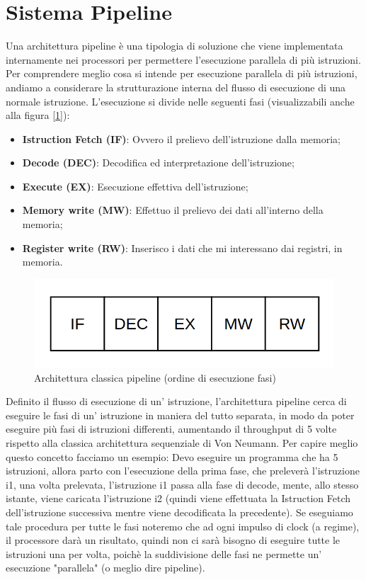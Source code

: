 \newpage
\section{Sistema Pipeline}
Una architettura pipeline è una tipologia di soluzione che viene implementata internamente nei processori per permettere l'esecuzione parallela di più istruzioni.
Per comprendere meglio cosa si intende per esecuzione parallela di più istruzioni, andiamo a considerare la strutturazione interna del flusso di esecuzione di una normale istruzione. L'esecuzione si divide nelle seguenti fasi (visualizzabili anche alla figura [\ref{img:pipe}]):
\begin{itemize}
    \item \textbf{Istruction Fetch (IF)}: Ovvero il prelievo dell'istruzione dalla memoria;
    \item \textbf{Decode (DEC)}: Decodifica ed interpretazione dell'istruzione;
    \item \textbf{Execute (EX)}: Esecuzione effettiva dell'istruzione;
    \item \textbf{Memory write (MW)}: Effettuo il prelievo dei dati all'interno della memoria;
    \item \textbf{Register write (RW)}: Inserisco i dati che mi interessano dai registri, in memoria. 
\end{itemize}

\begin{figure}[ht]
    \centering
    \includegraphics[width=.5\textwidth]{img/Pipeline.png}
    \caption{Architettura classica pipeline (ordine di esecuzione fasi)}\label{img:pipe}
\end{figure}

Definito il flusso di esecuzione di un' istruzione, l'architettura pipeline cerca di eseguire le fasi di un' istruzione in maniera del tutto separata, in modo da poter eseguire più fasi di istruzioni differenti, aumentando il throughput di 5 volte rispetto alla classica architettura sequenziale di Von Neumann. Per capire meglio questo concetto facciamo un esempio:
Devo eseguire un programma che ha 5 istruzioni, allora parto con l'esecuzione della prima fase, che preleverà l'istruzione i1, una volta prelevata, l'istruzione i1 passa alla fase di decode, mente, allo stesso istante, viene caricata l'istruzione i2 (quindi viene effettuata la Istruction Fetch dell'istruzione successiva mentre viene decodificata la precedente). Se eseguiamo tale procedura per tutte le fasi noteremo che ad ogni impulso di clock (a regime), il processore darà un risultato, quindi non ci sarà bisogno di eseguire tutte le istruzioni una per volta, poichè la suddivisione delle fasi ne permette un' esecuzione "parallela" (o meglio dire pipeline).

